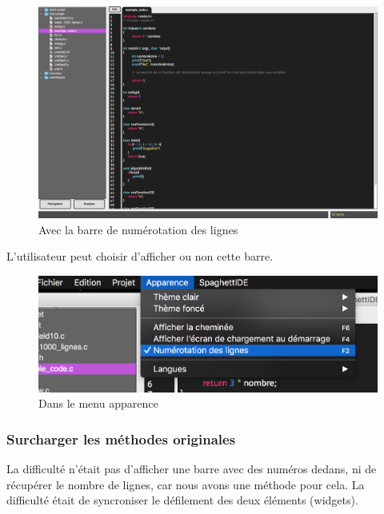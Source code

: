 \documentclass[a4paper,12pt]{article}
\begin{document}
		\begin{figure}[h!]
			\begin{center}
				\includegraphics[scale=0.17]{images/imgs_lines/apres}
				\caption{Avec la barre de numérotation des lignes}
			\end{center}
		\end{figure}
		
		\newpage
		
	L'utilisateur peut choisir d'afficher ou non cette barre.
	
		\begin{figure}[h!]
			\begin{center}
				\includegraphics[scale=0.8]{images/imgs_lines/menu}
				\caption{Dans le menu apparence}
			\end{center}
		\end{figure}
		
	\subsubsection{Surcharger les méthodes originales}

	La difficulté n'était pas d'afficher une barre avec des numéros dedans, ni de récupérer le nombre de lignes, car nous avons une méthode pour cela. La difficulté était de syncroniser le défilement des deux éléments (widgets).\\
		
\end{document}
